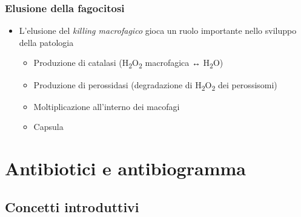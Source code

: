 \documentclass[italian,]{article}
\providecommand{\tightlist}{%
  \setlength{\itemsep}{0pt}\setlength{\parskip}{0pt}}
\begin{document}
\hypertarget{elusione-della-fagocitosi}{%
\subsubsection{Elusione della
fagocitosi}\label{elusione-della-fagocitosi}}

\begin{itemize}
\tightlist
\item
  L'elusione del \emph{killing macrofagico} gioca un ruolo importante
  nello sviluppo della patologia

  \begin{itemize}
  \tightlist
  \item
    Produzione di catalasi (H\textsubscript{2}O\textsubscript{2}
    macrofagica ↔ H\textsubscript{2}O)
  \item
    Produzione di perossidasi (degradazione di
    H\textsubscript{2}O\textsubscript{2} dei perossisomi)
  \item
    Moltiplicazione all'interno dei macofagi
  \item
    Capsula
  \end{itemize}
\end{itemize}

\clearpage

\hypertarget{antibiotici-e-antibiogramma}{%
\section{Antibiotici e
antibiogramma}\label{antibiotici-e-antibiogramma}}

\hypertarget{concetti-introduttivi}{%
\subsection{Concetti introduttivi}\label{concetti-introduttivi}}
\end{document}
